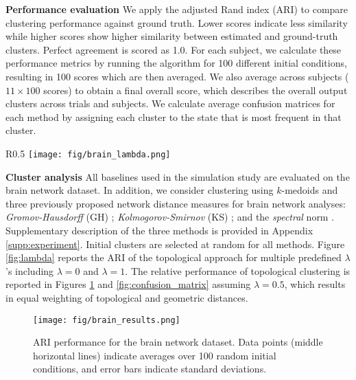 \documentclass{article} %
\begin{document}
\textbf{Performance evaluation}
We apply the adjusted Rand index (ARI) \citep{hubert1985comparing} to compare clustering performance against ground truth. 
Lower scores indicate less similarity while higher scores show higher similarity between estimated and ground-truth clusters. Perfect agreement is scored as 1.0.
For each subject, we calculate these performance metrics by running the algorithm for 100 different initial conditions, resulting in 100 scores which are then averaged. We also average across subjects ($11 \times 100$ scores) to obtain a final  overall score, which describes the overall output clusters across trials and subjects. We calculate average confusion matrices for each method by assigning each cluster to the state that is most frequent in that cluster.


\begin{wrapfigure}{R}{0.5\textwidth}
\vspace{-12pt}
\centering
\texttt{[image: fig/brain\_lambda.png]}
\vspace{-17pt}
\caption{\small Average ARI per subject (gray lines) and across all eleven subjects (red line) as a function of $\lambda$.
}
\vspace{-15pt}
\label{fig:lambda}
\end{wrapfigure}


\textbf{Cluster analysis}
All baselines used in the simulation study are evaluated on the brain network dataset.
In addition, we consider clustering using $k$-medoids and three previously proposed network distance measures for brain network analyses: {\em Gromov-Hausdorff} (GH) \citep{lee2012persistent}; {\em Kolmogorov-Smirnov} (KS) \citep{chung2019exact}; and the {\em spectral} norm \citep{banks2020cortical}. Supplementary description of the three methods is provided in Appendix \ref{supp:experiment}.
Initial clusters are selected at random for all methods. Figure \ref{fig:lambda} reports the ARI of the topological approach for multiple predefined $\lambda$'s including $\lambda = 0$ and $\lambda = 1$. The relative performance of topological clustering is reported in Figures \ref{fig:brain_results} and \ref{fig:confusion_matrix} assuming $\lambda=0.5$, which results in equal weighting of topological and geometric distances.


\begin{figure}
\texttt{[image: fig/brain\_results.png]}
\centering
\caption{ARI performance for the brain network dataset. Data points (middle horizontal lines) indicate averages over 100 random initial conditions, and error bars indicate standard deviations.}
\label{fig:brain_results}
\end{figure}
\end{document}
